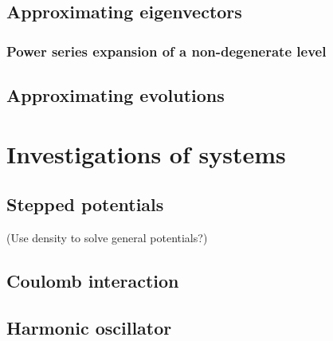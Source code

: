 \section{Approximating eigenvectors}
\subsection{Power series expansion of a non-degenerate level}

\section{Approximating evolutions}

\chapter{Investigations of systems}
\section{Stepped potentials}
(Use density to solve general potentials?)
\section{Coulomb interaction}
\section{Harmonic oscillator}